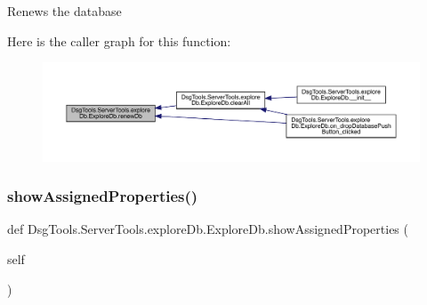 \begin{DoxyVerb}Renews the database
\end{DoxyVerb}
 Here is the caller graph for this function\+:
\nopagebreak
\begin{figure}[H]
\begin{center}
\leavevmode
\includegraphics[width=350pt]{class_dsg_tools_1_1_server_tools_1_1explore_db_1_1_explore_db_a98e476625fcaa5decfe1a37a3871514c_icgraph}
\end{center}
\end{figure}
\mbox{\label{class_dsg_tools_1_1_server_tools_1_1explore_db_1_1_explore_db_a6294868955f1101541f57b97faeadbf3}} 
\subsubsection{\texorpdfstring{show\+Assigned\+Properties()}{showAssignedProperties()}}
{\footnotesize\ttfamily def Dsg\+Tools.\+Server\+Tools.\+explore\+Db.\+Explore\+Db.\+show\+Assigned\+Properties (\begin{DoxyParamCaption}\item[{}]{self }\end{DoxyParamCaption})}


